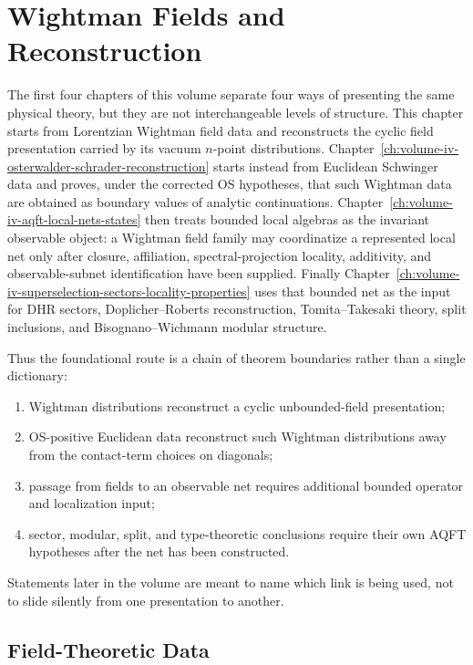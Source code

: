 \chapter{Wightman Fields and Reconstruction}
\label{ch:volume-iv-wightman-fields-reconstruction}
\ConventionsLorentzian

The first four chapters of this volume separate four ways of presenting the
same physical theory, but they are not interchangeable levels of structure.
This chapter starts from Lorentzian Wightman field data and reconstructs the
cyclic field presentation carried by its vacuum \(n\)-point distributions.
Chapter~\ref{ch:volume-iv-osterwalder-schrader-reconstruction} starts instead
from Euclidean Schwinger data and proves, under the corrected OS hypotheses,
that such Wightman data are obtained as boundary values of analytic
continuations.  Chapter~\ref{ch:volume-iv-aqft-local-nets-states} then treats
bounded local algebras as the invariant observable object: a Wightman field
family may coordinatize a represented local net only after closure,
affiliation, spectral-projection locality, additivity, and observable-subnet
identification have been supplied.  Finally
Chapter~\ref{ch:volume-iv-superselection-sectors-locality-properties} uses
that bounded net as the input for DHR sectors, Doplicher--Roberts
reconstruction, Tomita--Takesaki theory, split inclusions, and
Bisognano--Wichmann modular structure.

Thus the foundational route is a chain of theorem boundaries rather than a
single dictionary:
\begin{enumerate}[label=\textup{(\alph*)}]
\item Wightman distributions reconstruct a cyclic unbounded-field
presentation;
\item OS-positive Euclidean data reconstruct such Wightman distributions away
from the contact-term choices on diagonals;
\item passage from fields to an observable net requires additional bounded
operator and localization input;
\item sector, modular, split, and type-theoretic conclusions require their own
AQFT hypotheses after the net has been constructed.
\end{enumerate}
Statements later in the volume are meant to name which link is being used, not
to slide silently from one presentation to another.


\section{Field-Theoretic Data}


